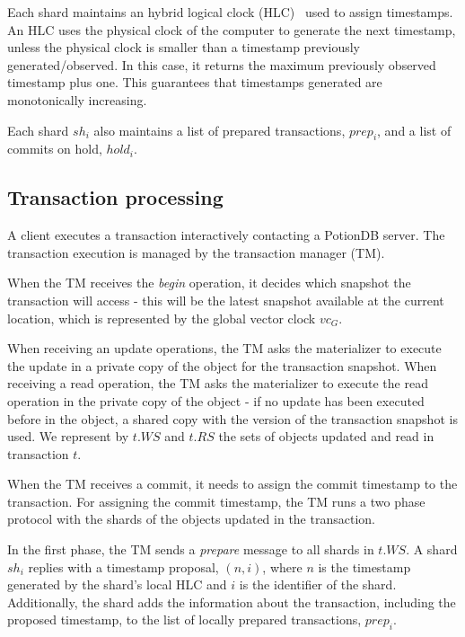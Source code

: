 \documentclass[sigconf, nonacm]{acmart}
\begin{document}
Each shard maintains an hybrid logical clock (HLC)~\cite{hlc} used to assign timestamps. An HLC uses the 
physical clock of the computer to generate the next timestamp, unless the physical clock is smaller than a timestamp
previously generated/observed. In this case, it returns the maximum previously observed timestamp plus one. 
This guarantees that timestamps generated are monotonically increasing.

Each shard $\mathit{sh}_i$ also maintains a list of prepared transactions, $prep_i$, and a list of commits on hold, $\mathit{hold}_i$.


\subsection{Transaction processing}

A client executes a transaction interactively contacting a PotionDB server.
The transaction execution is managed by the transaction manager (TM).

When the TM receives the \emph{begin} operation, it decides which snapshot the
transaction will access - this will be the latest snapshot available at the current location,
which is represented by the global vector clock $\mathit{vc}_G$.

When receiving an update operations, the TM asks the materializer to execute the update in
a private copy of the object for the transaction snapshot. When receiving a read operation, 
the TM asks the materializer to execute the read operation in the private copy 
of the object - if no update has been executed before in the object, a shared copy with the version 
of the transaction snapshot is used. We represent by $t.WS$ and $t.RS$ the sets of objects updated 
and read in transaction $t$.

When the TM receives a commit, it needs to assign the commit timestamp to the transaction. 
For assigning the commit timestamp, the TM runs a two phase protocol with the shards of the objects
updated in the transaction. 

In the first phase,  the TM sends a \emph{prepare} message to all shards in $t.WS$.
A shard $\mathit{sh}_i$ replies with a timestamp proposal, $(n,i)$, where $n$ is the timestamp
generated by the shard's local HLC and $i$ is the identifier of the shard. Additionally, the shard adds the information
about the transaction, including the proposed timestamp, to the list of locally prepared transactions, $prep_i$.
\end{document}

